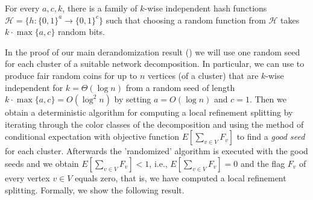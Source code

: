 \begin{theorem}\label{thm:seed}
For every $a,c,k$, there is a family of $k$-wise independent hash functions $\mathcal{H}=\{h:\{0,1\}^a\to\{0,1\}^c\}$ such that choosing a random function
from $\mathcal{H}$ takes $k\cdot\max\{a,c\}$ random bits.
\end{theorem}
In the proof of our main derandomization result () we will use one random seed for each cluster of a suitable network decomposition.  
In particular, we can use  to produce fair random coins for up to  $n$ vertices (of a cluster) that are $k$-wise independent for $k=\Theta(\log n)$ from a random seed of length $k\cdot \max\{a,c\}=O(\log^2 n)$ by setting $a=O(\log n)$ and $c=1$. 
Then we obtain a deterministic algorithm for computing a local refinement splitting by iterating through the color classes of the decomposition and  using  the method of conditional expectation with objective function $E[\sum_{v\in V}F_v]$ to find a \emph{good seed} for each cluster. Afterwards the 'randomized' algorithm is executed with the good seeds and we obtain $E[\sum_{v\in V}F_v]<1$, i.e., $E[\sum_{v\in V}F_v]=0$ and the flag $F_v$ of every vertex $v\in V$ equals zero, that is, we have computed a local refinement splitting. Formally, we show the following result.

\derandRefinementSplitting*

